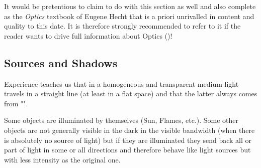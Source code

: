 	\begin{tcolorbox}[title=Remark,colframe=black,arc=10pt]
	It would be pretentious to claim to do with this section as well and also complete as the \textit{Optics} textbook of Eugene Hecht that is a priori unrivalled in content and quality to this date. It is therefore strongly recommended to refer to it if the reader wants to drive full information about Optics (\cite{hecht2016optics})!
	\end{tcolorbox}
	
	\pagebreak
	\subsection{Sources and Shadows}
	Experience teaches us that in a homogeneous and transparent medium light travels in a straight line (at least in a flat space) and that the latter always comes from "".
	
	Some objects are illuminated by themselves (Sun, Flames, etc.). Some other objects are not generally visible in the dark in the visible bandwidth (when there is absolutely no source of light) but if they are illuminated they send back all or part of light in some or all directions and therefore behave like light sources but with less intensity as the original one.
	
